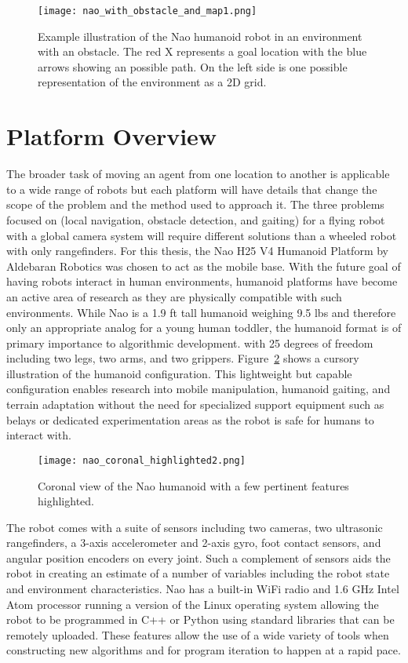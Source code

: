 \begin{figure}[h!]
	\centering
	\texttt{[image: nao\_with\_obstacle\_and\_map1.png]}
	\caption
	{Example illustration of the Nao humanoid robot in an environment with an obstacle. The red X represents a goal
		location with the blue arrows showing an possible path. On the left side is one possible representation
		of the environment as a 2D grid.}
	\label{fig:nao_with_map1}
\end{figure}


\section{Platform Overview}
The broader task of moving an agent from one location to another is applicable to a wide range of robots but
each platform will have details that change the scope of the problem and the method used to approach it.
The three problems focused on (local navigation, obstacle detection, and gaiting) for a flying robot with 
a global camera system will require different solutions than a wheeled robot with only rangefinders.
For this thesis, the Nao H25 V4 Humanoid Platform by Aldebaran Robotics was chosen to act as the mobile base. 
With the future goal of having robots interact in human environments, humanoid platforms have become an active
area of research as they are physically compatible with such environments. 
While Nao is a 1.9 ft tall humanoid weighing 9.5 lbs and therefore only an appropriate analog for a young human toddler,
the humanoid format is of primary importance to algorithmic development.
with 25 degrees of freedom including two legs, two arms, and two grippers. 
Figure~\ref{fig:nao_diagram1} shows a cursory illustration of the humanoid configuration.
This lightweight but capable configuration enables research into mobile manipulation, humanoid gaiting, and terrain adaptation
without the need for specialized support equipment such as belays or dedicated experimentation areas as the
robot is safe for humans to interact with.

\begin{figure}
	\centering
	\texttt{[image: nao\_coronal\_highlighted2.png]}
	\caption
	{Coronal view of the Nao humanoid with a few pertinent features highlighted. }
	\label{fig:nao_diagram1}
\end{figure}

The robot comes with a suite of sensors including two cameras, two ultrasonic rangefinders, 
a 3-axis accelerometer and 2-axis gyro, foot contact sensors, and angular position encoders on every joint.
Such a complement of sensors aids the robot in creating an estimate of a number of variables including 
the robot state and environment characteristics. 
Nao has a built-in WiFi radio and 1.6 GHz Intel Atom processor running a version of the Linux operating system 
allowing the robot to be programmed in C++ or Python using standard libraries that can be remotely uploaded.
These features allow the use of a wide variety of tools when constructing new algorithms and for program
iteration to happen at a rapid pace.

